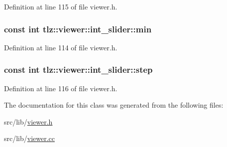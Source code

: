 Definition at line 115 of file viewer.\+h.

\subsubsection[{\texorpdfstring{min}{min}}]{\setlength{\rightskip}{0pt plus 5cm}const int tlz\+::viewer\+::int\+\_\+slider\+::min}\hypertarget{classtlz_1_1viewer_1_1int__slider_a019f877e645a365caec6173a4a2b3d70}{}\label{classtlz_1_1viewer_1_1int__slider_a019f877e645a365caec6173a4a2b3d70}


Definition at line 114 of file viewer.\+h.

\subsubsection[{\texorpdfstring{step}{step}}]{\setlength{\rightskip}{0pt plus 5cm}const int tlz\+::viewer\+::int\+\_\+slider\+::step}\hypertarget{classtlz_1_1viewer_1_1int__slider_a8675e4655f77bccba958eb2af5892ce0}{}\label{classtlz_1_1viewer_1_1int__slider_a8675e4655f77bccba958eb2af5892ce0}


Definition at line 116 of file viewer.\+h.



The documentation for this class was generated from the following files\+:\begin{DoxyCompactItemize}
\item 
src/lib/\hyperlink{viewer_8h}{viewer.\+h}\item 
src/lib/\hyperlink{lib_2viewer_8cc}{viewer.\+cc}\end{DoxyCompactItemize}

